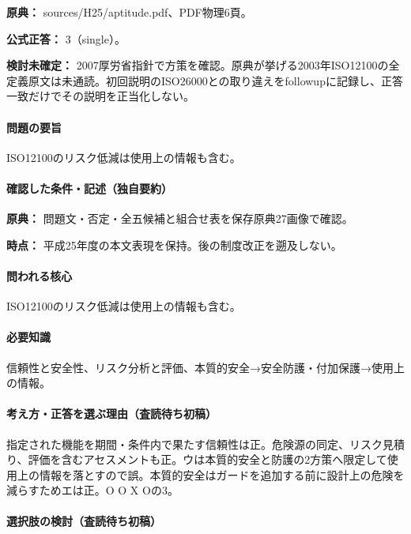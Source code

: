 \noindent\textbf{原典：} sources/H25/aptitude.pdf、PDF物理6頁。

\textbf{公式正答：} 3（single）。

\par\textbf{検討未確定：} 2007厚労省指針で方策を確認。原典が挙げる2003年ISO12100の全定義原文は未通読。初回説明のISO26000との取り違えをfollowupに記録し、正答一致だけでその説明を正当化しない。

\paragraph{問題の要旨} ISO12100のリスク低減は使用上の情報も含む。

\paragraph{確認した条件・記述（独自要約）}\mbox{}\par

\noindent\textbf{原典：} 問題文・否定・全五候補と組合せ表を保存原典27画像で確認。\par

\noindent\textbf{時点：} 平成25年度の本文表現を保持。後の制度改正を遡及しない。\par

\paragraph{問われる核心} ISO12100のリスク低減は使用上の情報も含む。

\paragraph{必要知識} 信頼性と安全性、リスク分析と評価、本質的安全→安全防護・付加保護→使用上の情報。

\paragraph{考え方・正答を選ぶ理由（査読待ち初稿）} 指定された機能を期間・条件内で果たす信頼性は正。危険源の同定、リスク見積り、評価を含むアセスメントも正。ウは本質的安全と防護の2方策へ限定して使用上の情報を落とすので誤。本質的安全はガードを追加する前に設計上の危険を減らすためエは正。O O X Oの3。

\paragraph{選択肢の検討（査読待ち初稿）}\mbox{}\par

